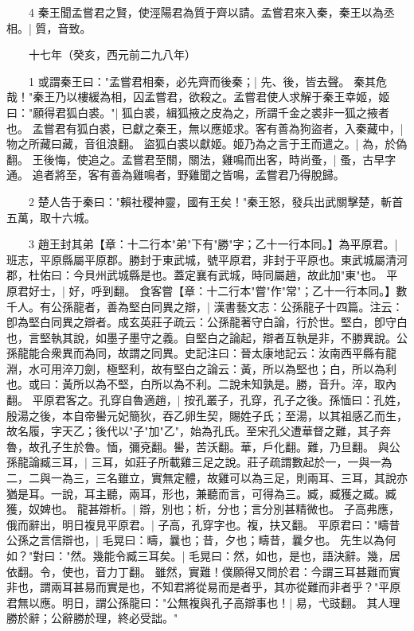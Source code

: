 　　4 秦王聞孟嘗君之賢，使涇陽君為質于齊以請。孟嘗君來入秦，秦王以為丞相。|{
	質，音致。
	}

　　十七年（癸亥，西元前二九八年）

　　1 或謂秦王曰："孟嘗君相秦，必先齊而後秦；|{
	先、後，皆去聲。
	}
秦其危哉！"秦王乃以樓緩為相，囚孟嘗君，欲殺之。孟嘗君使人求解于秦王幸姬，姬曰："願得君狐白裘。"|{
	狐白裘，緝狐掖之皮為之，所謂千金之裘非一狐之掖者也。
	}
孟嘗君有狐白裘，已獻之秦王，無以應姬求。客有善為狗盜者，入秦藏中，|{
	物之所藏曰藏，音徂浪翻。
	}
盜狐白裘以獻姬。姬乃為之言于王而遣之。|{
	為，於偽翻。
	}
王後悔，使追之。孟嘗君至關，關法，雞鳴而出客，時尚蚤，|{
	蚤，古早字通。
	}
追者將至，客有善為雞鳴者，野雞聞之皆鳴，孟嘗君乃得脫歸。

　　2 楚人告于秦曰："賴社稷神靈，國有王矣！"秦王怒，發兵出武關擊楚，斬首五萬，取十六城。

　　3 趙王封其弟【章：十二行本"弟"下有"勝"字；乙十一行本同。】為平原君。|{
	班志，平原縣屬平原郡。勝封于東武城，號平原君，非封于平原也。東武城屬清河郡，杜佑曰：今貝州武城縣是也。蓋定襄有武城，時同屬趙，故此加"東"也。
	}
平原君好士，|{
	好，呼到翻。
	}
食客嘗【章：十二行本"嘗"作"常"；乙十一行本同。】數千人。有公孫龍者，善為堅白同異之辯，|{
	漢書藝文志：公孫龍子十四篇。注云：卽為堅白同異之辯者。成玄英莊子疏云：公孫龍著守白論，行於世。堅白，卽守白也，言堅執其說，如墨子墨守之義。自堅白之論起，辯者互執是非，不勝異說。公孫龍能合衆異而為同，故謂之同異。史記注曰：晉太康地記云：汝南西平縣有龍淵，水可用淬刀劍，極堅利，故有堅白之論云：黃，所以為堅也；白，所以為利也。或曰：黃所以為不堅，白所以為不利。二說未知孰是。勝，音升。淬，取內翻。
	}
平原君客之。孔穿自魯適趙，|{
	按孔叢子，孔穿，孔子之後。孫愐曰：孔姓，殷湯之後，本自帝嚳元妃簡狄，吞乙卵生契，賜姓子氏；至湯，以其祖感乙而生，故名履，字天乙；後代以"子"加"乙"，始為孔氏。至宋孔父遭華督之難，其子奔魯，故孔子生於魯。愐，彌兗翻。嚳，苦沃翻。華，戶化翻。難，乃旦翻。
	}
與公孫龍論臧三耳，|{
	三耳，如莊子所載雞三足之說。莊子疏謂數起於一，一與一為二，二與一為三，三名雖立，實無定體，故雞可以為三足，則兩耳、三耳，其說亦猶是耳。一說，耳主聽，兩耳，形也，兼聽而言，可得為三。臧，臧獲之臧。臧獲，奴婢也。
	}
龍甚辯析。|{
	辯，別也；析，分也；言分別甚精微也。
	}
子高弗應，俄而辭出，明日複見平原君。|{
	子高，孔穿字也。複，扶又翻。
	}
平原君曰："疇昔公孫之言信辯也，|{
	毛晃曰：疇，曩也；昔，夕也；疇昔，曩夕也。
	}
先生以為何如？"對曰："然。幾能令臧三耳矣。|{
	毛晃曰：然，如也，是也，語決辭。幾，居依翻。令，使也，音力丁翻。
	}
雖然，實難！僕願得又問於君：今謂三耳甚難而實非也，謂兩耳甚易而實是也，不知君將從易而是者乎，其亦從難而非者乎？"平原君無以應。明日，謂公孫龍曰："公無複與孔子高辯事也！|{
	易，弋豉翻。
	}
其人理勝於辭；公辭勝於理，終必受詘。"

